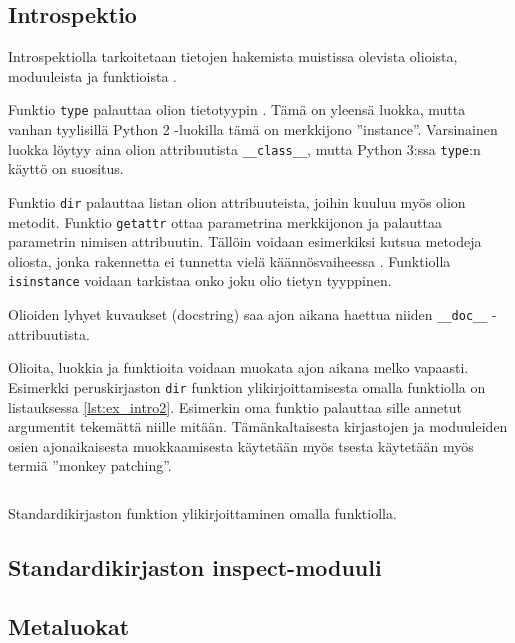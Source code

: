 \documentclass[finnish]{tktltiki2}
\theoremstyle{definition}
\theoremstyle{remark}
\begin{document}
\subsection{Introspektio}

Introspektiolla tarkoitetaan tietojen hakemista muistissa olevista olioista, moduuleista ja funktioista \cite{dive-into-python}.

Funktio \verb|type| palauttaa olion tietotyypin \cite{dive-into-python}. Tämä on yleensä luokka, mutta vanhan tyylisillä Python 2 -luokilla tämä on merkkijono ''instance''. Varsinainen luokka löytyy aina olion attribuutista \verb|__class__|, mutta Python 3:ssa \verb|type|:n käyttö on suositus.

Funktio \verb|dir| palauttaa listan olion attribuuteista, joihin kuuluu myös olion metodit. Funktio \verb|getattr| ottaa parametrina merkkijonon ja palauttaa parametrin nimisen attribuutin. Tällöin voidaan esimerkiksi kutsua metodeja oliosta, jonka rakennetta ei tunnetta vielä käännösvaiheessa \cite{dive-into-python}. Funktiolla \verb|isinstance| voidaan tarkistaa onko joku olio tietyn tyyppinen. 

Olioiden lyhyet kuvaukset (docstring) saa ajon aikana haettua niiden \verb|__doc__| -attribuutista. 

Olioita, luokkia ja funktioita voidaan muokata ajon aikana melko vapaasti. Esimerkki peruskirjaston \verb|dir| funktion ylikirjoittamisesta omalla funktiolla on listauksessa \ref{lst:ex_intro2}. Esimerkin oma funktio palauttaa sille annetut argumentit tekemättä niille mitään. Tämänkaltaisesta kirjastojen ja moduuleiden osien ajonaikaisesta muokkaamisesta käytetään myös tsesta käytetään myös termiä ''monkey patching''.

\begin{listing}
    \inputminted{python}{code/introspektio2.py}
    \label{lst:ex_intro2}
    \caption{Standardikirjaston funktion ylikirjoittaminen omalla funktiolla.}
\end{listing}

\subsection{Standardikirjaston inspect-moduuli}


\subsection{Metaluokat}
\end{document}
